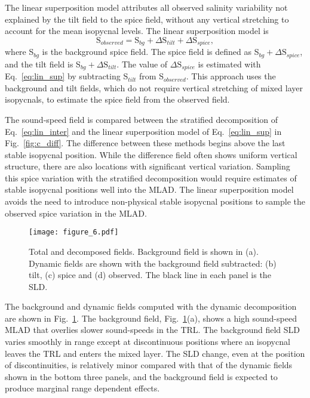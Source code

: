 \documentclass[preprint,NumberedRefs]{JASA}
\begin{document}
The linear superposition model attributes all observed salinity variability not explained by the tilt field to the spice field, without any vertical stretching to account for the mean isopycnal levels. The linear superposition model is
\begin{equation}
    \textrm{S}_{observed} = \textrm{S}_{bg} + \Delta \textrm{S}_{tilt} + \Delta \textrm{S}_{spice},
    \label{eq:lin_sup}
\end{equation}
where S$_{bg}$ is the background spice field. The spice field is defined as S$_{bg} + \Delta \textrm{S}_{spice}$, and the tilt field is S$_{bg} + \Delta \textrm{S}_{tilt}$. The value of $\Delta \textrm{S}_{spice}$ is estimated with Eq.~\eqref{eq:lin_sup} by subtracting S$_{tilt}$ from S$_{observed}$. This approach uses the background and tilt fields, which do not require vertical stretching of mixed layer isopycnals, to estimate the spice field from the observed field.

The sound-speed field is compared between the stratified decomposition of Eq.~\eqref{eq:lin_inter} and the linear superposition model of Eq.~\eqref{eq:lin_sup} in Fig.~\ref{fig:c_diff}. The difference between these methods begins above the last stable isopycnal position. While the difference field often shows uniform vertical structure, there are also locations with significant vertical variation. Sampling this spice variation with the stratified decomposition would require estimates of stable isopycnal positions well into the MLAD. The linear superposition model avoids the need to introduce non-physical stable isopycnal positions to sample the observed spice variation in the MLAD.

\begin{figure}
\texttt{[image: figure\_6.pdf]}
        \caption{\label{fig:c_fields}{Total and decomposed fields. Background field is shown in (a). Dynamic fields are shown with the background field subtracted: (b) tilt, (c) spice and (d) observed. The black line in each panel is the SLD.}}
\end{figure}

The background and dynamic fields computed with the dynamic decomposition are shown in Fig.~\ref{fig:c_fields}. The background field, Fig.~\ref{fig:c_fields}(a), shows a high sound-speed MLAD that overlies slower sound-speeds in the TRL. The background field SLD varies smoothly in range except at discontinuous positions where an isopycnal leaves the TRL and enters the mixed layer. The SLD change, even at the position of discontinuities, is relatively minor compared with that of the dynamic fields shown in the bottom three panels, and the background field is expected to produce marginal range dependent effects.
\end{document}
